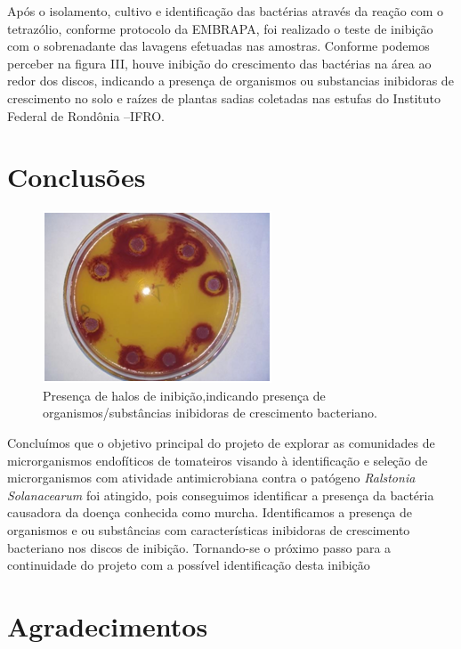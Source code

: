 \documentclass[article,12pt,onesidea,4paper,english,brazil]{abntex2}
\begin{document}
Após o isolamento, cultivo e identificação das bactérias através da reação com o tetrazólio, conforme protocolo da EMBRAPA, foi realizado o teste de inibição com o sobrenadante das lavagens efetuadas nas amostras. Conforme podemos perceber na figura III, houve inibição do crescimento das bactérias na área ao redor dos discos, indicando a presença de organismos ou substancias inibidoras de crescimento no solo e raízes de plantas sadias coletadas nas estufas do Instituto Federal de Rondônia –IFRO.
	
	\section*{Conclusões}
	
	\begin{figure}[h]
		\centering
		\includegraphics[width=0.7\linewidth]{pip1.png}
		\caption{Presença de halos de inibição,indicando presença de organismos/substâncias inibidoras de crescimento bacteriano.}
	\end{figure}
	
	Concluímos que o objetivo principal do projeto de explorar as comunidades de microrganismos endofíticos de tomateiros visando à identificação e seleção de microrganismos com atividade antimicrobiana contra o patógeno \textit{Ralstonia Solanacearum} foi atingido, pois conseguimos identificar a presença da bactéria causadora da doença conhecida como murcha. Identificamos a presença de organismos e ou substâncias com características inibidoras de crescimento bacteriano nos discos de inibição. Tornando-se o próximo passo para a continuidade do projeto com a possível identificação desta inibição
	
	\section{Agradecimentos}
	
\end{document}
